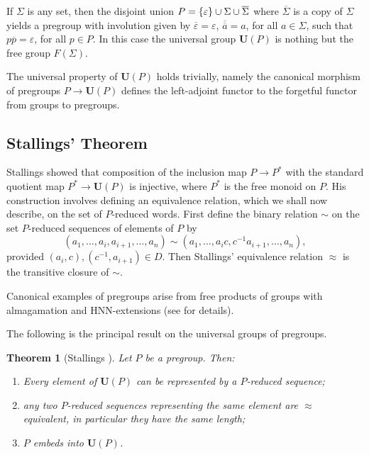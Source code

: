 \documentclass[a4paper]{article}
\newcommand\ov[1]{\overline{#1}} %
\newcommand\eps{\varepsilon}
\newcommand{\Uvec}{\mathbf{U}}	%
\newcommand{\UP}{\Uvec(P)}
\newcommand{\smallset}[1]{\left\{\mathinner{#1}\right\}}
\theoremstyle{plain}
\newtheorem{theorem}{Theorem}[section]
\theoremstyle{definition}
\begin{document}
If ${\Sigma}$ is any set, then
the disjoint union $P= \smallset{\eps} \cup \Sigma \cup \ov{\Sigma}$
where $\ov{\Sigma}$ is a copy of ${\Sigma}$
yields a pregroup with involution given by $\ov \eps=\eps$, $\ov{\ov{a}}=a$,
for all $a\in \Sigma$,  such that $p \ov{p} = \eps$,
for all $p\in P$.
In this case the universal
group $\UP$ is nothing but the free group $F(\Sigma)$.

The universal property of $\UP$ holds trivially, namely
the canonical morphism of pregroups $P \to \UP$ defines the
left-adjoint functor to the {forgetful}
functor from groups to pregroups.

\subsection{Stallings' Theorem}\label{sec:stall}
Stallings \cite{Stallings_1971} showed that composition of the
inclusion map $P \rightarrow P^\ast$
 with the standard quotient map $P^\ast \rightarrow \UP$ is injective,
where $P^\ast$ is the free monoid on $P$. His construction involves defining
an equivalence relation, which we shall now describe, on the set of 
$P$-reduced words.
First define the binary relation  $\sim$ on the set $P$-reduced sequences of elements
of $P$ by
$$(a_1,\ldots, a_i,a_{i+1},\ldots, a_n)\sim
(a_1,\ldots ,a_ic,c^{-1}a_{i+1},\ldots, a_n),$$
provided  $(a_i,c),(c^{-1},a_{i+1}) \in D.$
Then Stallings' equivalence relation $\approx$ is the transitive closure of $\sim$.

Canonical examples of pregroups arise from free products of groups with
almagamation and HNN-extensions (see \cite{DiekertDuncanMiasnikov_2010} for details).


The following is the principal result on the universal groups of pregroups.

\begin{theorem} [Stallings \cite{Stallings_1971}]\label{thm:sup}
Let $P$ be a pregroup. Then:
\begin{enumerate}[1)]
\item Every element of $\UP$ can be  represented by
a $P$-reduced sequence;
\item  any two $P$-reduced sequences representing
the same element are $\approx$ equivalent, in particular they have the same length;\label{it:sup2}
\item $P$ embeds into  $\UP$.
\end{enumerate}
 \end{theorem}
\end{document}
